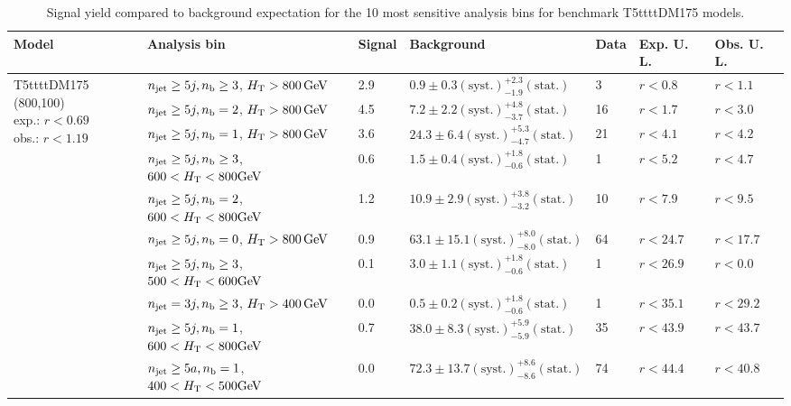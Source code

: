 \begin{table}[h!] 
  \scriptsize
  \caption{ 
Signal yield compared to background expectation for the 10 most sensitive analysis bins 
for benchmark T5ttttDM175 models.
  \label{tab:sigBenchmarksYields_T5ttttDM175}}
  \centering 
  \begin{tabular}{ lllllll } 
    \hline 
    \hline 
    Model & Analysis bin & Signal & Background & Data & Exp. U. L. & Obs. U. L. \\ \hline
\multirow{10}{*}{\parbox[t]{2cm}{T5ttttDM175 (800,100)\\exp.: $r<0.69$\\obs.: $r<1.19$}}
 & $n_{\mathrm{jet}} \geq5j,n_{\text{b}} \geq3$, $\mbox{$H_\text{T}$} > 800 \, \mathrm{GeV}$ & 2.9 & $0.9 \pm 0.3 \mathrm{(syst.)} ^{+2.3}_{-1.9} \mathrm{(stat.)}$ & 3 & $r < 0.8$ & $r < 1.1$\\ 
 & $n_{\mathrm{jet}} \geq5j,n_{\text{b}} =2$, $\mbox{$H_\text{T}$} > 800 \, \mathrm{GeV}$ & 4.5 & $7.2 \pm 2.2 \mathrm{(syst.)} ^{+4.8}_{-3.7} \mathrm{(stat.)}$ & 16 & $r < 1.7$ & $r < 3.0$\\ 
 & $n_{\mathrm{jet}} \geq5j,n_{\text{b}} =1$, $\mbox{$H_\text{T}$} > 800 \, \mathrm{GeV}$ & 3.6 & $24.3 \pm 6.4 \mathrm{(syst.)} ^{+5.3}_{-4.7} \mathrm{(stat.)}$ & 21 & $r < 4.1$ & $r < 4.2$\\ 
 & $n_{\mathrm{jet}} \geq5j,n_{\text{b}} \geq3$, $600 < \mbox{$H_\text{T}$} < 800 \mathrm{GeV}$ & 0.6 & $1.5 \pm 0.4 \mathrm{(syst.)} ^{+1.8}_{-0.6} \mathrm{(stat.)}$ & 1 & $r < 5.2$ & $r < 4.7$\\ 
 & $n_{\mathrm{jet}} \geq5j,n_{\text{b}} =2$, $600 < \mbox{$H_\text{T}$} < 800 \mathrm{GeV}$ & 1.2 & $10.9 \pm 2.9 \mathrm{(syst.)} ^{+3.8}_{-3.2} \mathrm{(stat.)}$ & 10 & $r < 7.9$ & $r < 9.5$\\ 
 & $n_{\mathrm{jet}} \geq5j,n_{\text{b}} =0$, $\mbox{$H_\text{T}$} > 800 \, \mathrm{GeV}$ & 0.9 & $63.1 \pm 15.1 \mathrm{(syst.)} ^{+8.0}_{-8.0} \mathrm{(stat.)}$ & 64 & $r < 24.7$ & $r < 17.7$\\ 
 & $n_{\mathrm{jet}} \geq5j,n_{\text{b}} \geq3$, $500 < \mbox{$H_\text{T}$} < 600 \mathrm{GeV}$ & 0.1 & $3.0 \pm 1.1 \mathrm{(syst.)} ^{+1.8}_{-0.6} \mathrm{(stat.)}$ & 1 & $r < 26.9$ & $r < 0.0$\\ 
 & $n_{\mathrm{jet}} =3j,n_{\text{b}} \geq3$, $\mbox{$H_\text{T}$} > 400 \, \mathrm{GeV}$ & 0.0 & $0.5 \pm 0.2 \mathrm{(syst.)} ^{+1.8}_{-0.6} \mathrm{(stat.)}$ & 1 & $r < 35.1$ & $r < 29.2$\\ 
 & $n_{\mathrm{jet}} \geq5j,n_{\text{b}} =1$, $600 < \mbox{$H_\text{T}$} < 800 \mathrm{GeV}$ & 0.7 & $38.0 \pm 8.3 \mathrm{(syst.)} ^{+5.9}_{-5.9} \mathrm{(stat.)}$ & 35 & $r < 43.9$ & $r < 43.7$\\ 
 & $n_{\mathrm{jet}} \geq5a,n_{\text{b}} =1$, $400 < \mbox{$H_\text{T}$} < 500 \mathrm{GeV}$ & 0.0 & $72.3 \pm 13.7 \mathrm{(syst.)} ^{+8.6}_{-8.6} \mathrm{(stat.)}$ & 74 & $r < 44.4$ & $r < 40.8$\\ \hline

\end{tabular}
\end{table}
